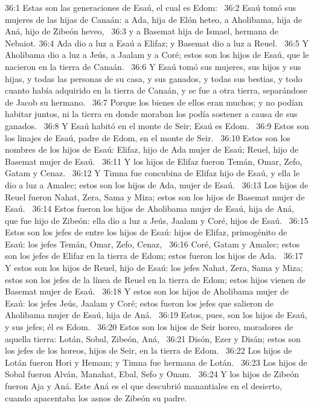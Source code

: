 36:1 Estas son las generaciones de Esaú, el cual es Edom:  
36:2 Esaú tomó sus mujeres de las hijas de Canaán: a Ada, hija de Elón heteo, a Aholibama, hija de Aná, hijo de Zibeón heveo,  
36:3 y a Basemat hija de Ismael, hermana de Nebaiot. 
36:4 Ada dio a luz a Esaú a Elifaz; y Basemat dio a luz a Reuel.  
36:5 Y Aholibama dio a luz a Jeús, a Jaalam y a Coré; estos son los hijos de Esaú, que le nacieron en la tierra de Canaán.  
36:6 Y Esaú tomó sus mujeres, sus hijos y sus hijas, y todas las personas de su casa, y sus ganados, y todas sus bestias, y todo cuanto había adquirido en la tierra de Canaán, y se fue a otra tierra, separándose de Jacob su hermano.  
36:7 Porque los bienes de ellos eran muchos; y no podían habitar juntos, ni la tierra en donde moraban los podía sostener a causa de sus ganados.  
36:8 Y Esaú habitó en el monte de Seir; Esaú es Edom.  
36:9 Estos son los linajes de Esaú, padre de Edom, en el monte de Seir.  
36:10 Estos son los nombres de los hijos de Esaú: Elifaz, hijo de Ada mujer de Esaú; Reuel, hijo de Basemat mujer de Esaú.  
36:11 Y los hijos de Elifaz fueron Temán, Omar, Zefo, Gatam y Cenaz.  
36:12 Y Timna fue concubina de Elifaz hijo de Esaú, y ella le dio a luz a Amalec; estos son los hijos de Ada, mujer de Esaú.  
36:13 Los hijos de Reuel fueron Nahat, Zera, Sama y Miza; estos son los hijos de Basemat mujer de Esaú.  
36:14 Estos fueron los hijos de Aholibama mujer de Esaú, hija de Aná, que fue hijo de Zibeón: ella dio a luz a Jeús, Jaalam y Coré, hijos de Esaú.  
36:15 Estos son los jefes de entre los hijos de Esaú: hijos de Elifaz, primogénito de Esaú: los jefes Temán, Omar, Zefo, Cenaz,  
36:16 Coré, Gatam y Amalec; estos son los jefes de Elifaz en la tierra de Edom; estos fueron los hijos de Ada.  
36:17 Y estos son los hijos de Reuel, hijo de Esaú: los jefes Nahat, Zera, Sama y Miza; estos son los jefes de la línea de Reuel en la tierra de Edom; estos hijos vienen de Basemat mujer de Esaú.  
36:18 Y estos son los hijos de Aholibama mujer de Esaú: los jefes Jeús, Jaalam y Coré; estos fueron los jefes que salieron de Aholibama mujer de Esaú, hija de Aná.  
36:19 Estos, pues, son los hijos de Esaú, y sus jefes; él es Edom.  
36:20 Estos son los hijos de Seir horeo, moradores de aquella tierra: Lotán, Sobal, Zibeón, Aná,  
36:21 Disón, Ezer y Disán; estos son los jefes de los horeos, hijos de Seir, en la tierra de Edom.  
36:22 Los hijos de Lotán fueron Hori y Hemam; y Timna fue hermana de Lotán.  
36:23 Los hijos de Sobal fueron Alván, Manahat, Ebal, Sefo y Onam.  
36:24 Y los hijos de Zibeón fueron Aja y Aná. Este Aná es el que descubrió manantiales en el desierto, cuando apacentaba los asnos de Zibeón su padre.  
